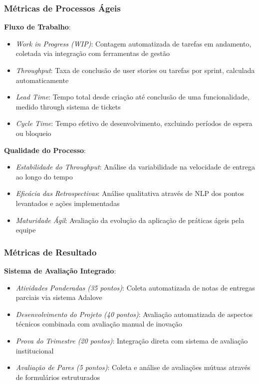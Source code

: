 \documentclass[12pt, a4paper, oneside]{abntex2}
\begin{document}
\subsubsection{Métricas de Processos Ágeis}

\textbf{Fluxo de Trabalho}:
\begin{itemize}
\item \textit{Work in Progress (WIP)}: Contagem automatizada de tarefas em andamento, coletada via integração com ferramentas de gestão
\item \textit{Throughput}: Taxa de conclusão de user stories ou tarefas por sprint, calculada automaticamente
\item \textit{Lead Time}: Tempo total desde criação até conclusão de uma funcionalidade, medido through sistema de tickets
\item \textit{Cycle Time}: Tempo efetivo de desenvolvimento, excluindo períodos de espera ou bloqueio
\end{itemize}

\textbf{Qualidade do Processo}:
\begin{itemize}
\item \textit{Estabilidade do Throughput}: Análise da variabilidade na velocidade de entrega ao longo do tempo
\item \textit{Eficácia das Retrospectivas}: Análise qualitativa através de NLP dos pontos levantados e ações implementadas
\item \textit{Maturidade Ágil}: Avaliação da evolução da aplicação de práticas ágeis pela equipe
\end{itemize}

\subsubsection{Métricas de Resultado}

\textbf{Sistema de Avaliação Integrado}:
\begin{itemize}
\item \textit{Atividades Ponderadas (35 pontos)}: Coleta automatizada de notas de entregas parciais via sistema Adalove
\item \textit{Desenvolvimento do Projeto (40 pontos)}: Avaliação automatizada de aspectos técnicos combinada com avaliação manual de inovação
\item \textit{Prova do Trimestre (20 pontos)}: Integração direta com sistema de avaliação institucional
\item \textit{Avaliação de Pares (5 pontos)}: Coleta e análise de avaliações mútuas através de formulários estruturados
\end{itemize}
\end{document}
